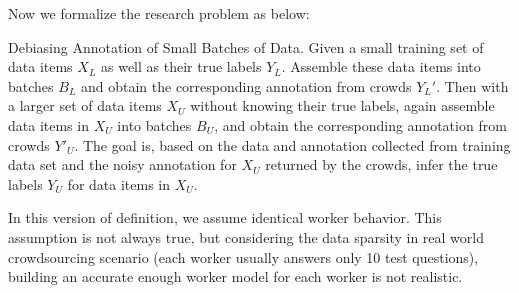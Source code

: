 Now we formalize the research problem as below:

\begin{problem} {Debiasing Annotation of Small Batches of Data.}
Given a small training set of data items $X_L$ as well as their true labels $Y_L$.  
Assemble these data items into batches $B_L$ and obtain the corresponding annotation from crowds $Y_L'$.  
Then with a larger set of data items $X_U$ without knowing their true labels, 
again assemble data items in $X_U$ into batches $B_U$, and obtain the corresponding annotation from crowds $Y'_U$.  
The goal is, based on the data and annotation collected from training data set 
and the noisy annotation for $X_U$ returned by the crowds, 
infer the true labels $Y_U$ for data items in $X_U$.  
\end{problem}


In this version of definition, we assume identical worker behavior.  
This assumption is not always true, 
but considering the data sparsity in real world crowdsourcing scenario 
(each worker usually answers only 10 test questions), 
building an accurate enough worker model for each worker is not realistic.  



